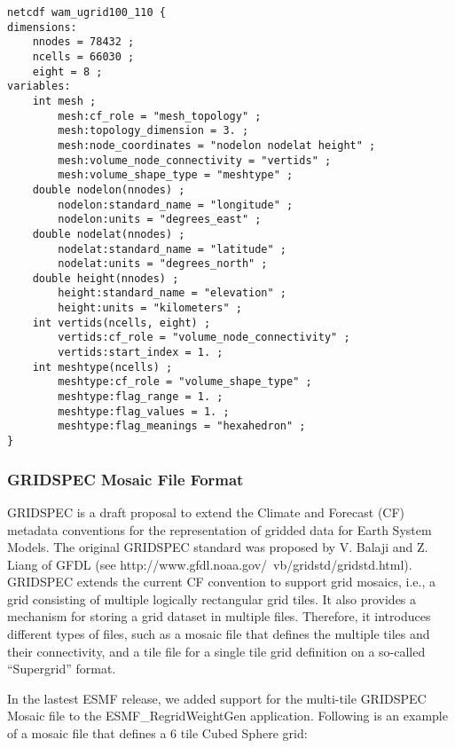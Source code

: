 \begin{verbatim}
netcdf wam_ugrid100_110 {
dimensions:
	nnodes = 78432 ;
	ncells = 66030 ;
	eight = 8 ;
variables:
	int mesh ;
		mesh:cf_role = "mesh_topology" ;
		mesh:topology_dimension = 3. ;
		mesh:node_coordinates = "nodelon nodelat height" ;
		mesh:volume_node_connectivity = "vertids" ;
		mesh:volume_shape_type = "meshtype" ;
	double nodelon(nnodes) ;
		nodelon:standard_name = "longitude" ;
		nodelon:units = "degrees_east" ;
	double nodelat(nnodes) ;
		nodelat:standard_name = "latitude" ;
		nodelat:units = "degrees_north" ;
	double height(nnodes) ;
		height:standard_name = "elevation" ;
		height:units = "kilometers" ;
	int vertids(ncells, eight) ;
		vertids:cf_role = "volume_node_connectivity" ;
		vertids:start_index = 1. ;
	int meshtype(ncells) ;
		meshtype:cf_role = "volume_shape_type" ;
		meshtype:flag_range = 1. ;
		meshtype:flag_values = 1. ;
		meshtype:flag_meanings = "hexahedron" ;
}
\end{verbatim}

\subsubsection{GRIDSPEC Mosaic File Format}\label{sec:fileformat:mosaic}

GRIDSPEC is a draft proposal to extend the Climate and Forecast (CF) metadata conventions for the representation of gridded data for Earth System Models.  The original GRIDSPEC standard was proposed by V. Balaji and Z. Liang of GFDL (see  {http://www.gfdl.noaa.gov/~vb/gridstd/gridstd.html}). GRIDSPEC extends the current CF convention to support grid  mosaics, i.e., a grid consisting of multiple logically
rectangular grid tiles. It also provides a mechanism for storing a grid dataset in multiple files.  Therefore,
it introduces different types of files, such as a mosaic file that defines the multiple tiles and their
connectivity, and a tile file for a single tile grid definition on a so-called ``Supergrid'' format.

In the lastest ESMF release, we added support for the multi-tile GRIDSPEC Mosaic file to the ESMF\_RegridWeightGen application.  
Following is an example of a mosaic file that defines a 6 tile Cubed Sphere grid:


